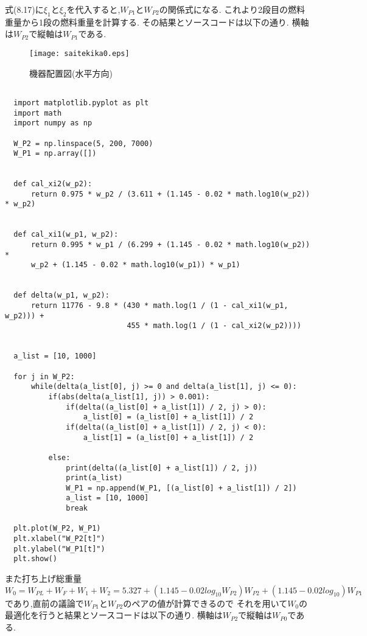 \documentclass[15pt,uplatex,dvipdfmx]{jsarticle}
\begin{document}
式(8.17)に$\xi_1$と$\xi_2$を代入すると,$W_{P1}$と$W_{P2}$の関係式になる.
これより2段目の燃料重量から1段の燃料重量を計算する.
その結果とソースコードは以下の通り.
横軸は$W_{P2}$で縦軸は$W_{P1}$である.

\begin{figure}[H]
  \caption{機器配置図(水平方向)}
\begin{center}
  \texttt{[image: saitekika0.eps]}
\end{center}
\end{figure}
\newpage

\begin{lstlisting}[basicstyle=\ttfamily\footnotesize, frame=single]

  import matplotlib.pyplot as plt
  import math
  import numpy as np

  W_P2 = np.linspace(5, 200, 7000)
  W_P1 = np.array([])


  def cal_xi2(w_p2):
      return 0.975 * w_p2 / (3.611 + (1.145 - 0.02 * math.log10(w_p2)) * w_p2)


  def cal_xi1(w_p1, w_p2):
      return 0.995 * w_p1 / (6.299 + (1.145 - 0.02 * math.log10(w_p2)) *
      w_p2 + (1.145 - 0.02 * math.log10(w_p1)) * w_p1)


  def delta(w_p1, w_p2):
      return 11776 - 9.8 * (430 * math.log(1 / (1 - cal_xi1(w_p1, w_p2))) +
                            455 * math.log(1 / (1 - cal_xi2(w_p2))))


  a_list = [10, 1000]

  for j in W_P2:
      while(delta(a_list[0], j) >= 0 and delta(a_list[1], j) <= 0):
          if(abs(delta(a_list[1], j)) > 0.001):
              if(delta((a_list[0] + a_list[1]) / 2, j) > 0):
                  a_list[0] = (a_list[0] + a_list[1]) / 2
              if(delta((a_list[0] + a_list[1]) / 2, j) < 0):
                  a_list[1] = (a_list[0] + a_list[1]) / 2

          else:
              print(delta((a_list[0] + a_list[1]) / 2, j))
              print(a_list)
              W_P1 = np.append(W_P1, [(a_list[0] + a_list[1]) / 2])
              a_list = [10, 1000]
              break

  plt.plot(W_P2, W_P1)
  plt.xlabel("W_P2[t]")
  plt.ylabel("W_P1[t]")
  plt.show()

\end{lstlisting}

また打ち上げ総重量
\begin{equation}
W_0 = W_{PL} + W_F + W_1 + W_2
   = 5.327 +(1.145 - 0.02 log_{10} W_{P2})W_{P2} + (1.145 - 0.02 log_{10}) W_{P1}
\end{equation}
であり,直前の議論で$W_{P1}$と$W_{P2}$のペアの値が計算できるので
それを用いて$W_0$の最適化を行うと結果とソースコードは以下の通り.
横軸は$W_{P2}$で縦軸は$W_{P0}$である.
\end{document}
